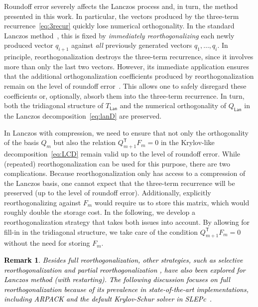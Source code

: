 \documentclass{siamart190516}
\newcommand{\Ttran}{\mathsf{T}}
\newcommand{\lan}{\mathsf{Lan}}
\newtheorem{remark}[theorem]{Remark}
\providecommand{\edit}[1]{\textcolor{black}{#1}}
\begin{document}
Roundoff error severely affects the Lanczos process and, in turn, the method presented in this work. In particular, the vectors 
produced by the three-term recurrence~\cref{eq:3recur} quickly lose numerical orthogonality. In the standard Lanczos method~\cite[p.~303]{Parlett1998}, this is fixed by \emph{immediately reorthogonalizing} each newly produced vector $q_{i+1}$ against \emph{all} previously generated vectors $q_1,\ldots, q_i$.
In principle, reorthogonalization destroys the three-term recurrence, since it involves more than only the last two vectors.
However, its immediate application ensures that the additional orthogonalization 
coefficients produced by reorthogonalization remain on the level of roundoff error~\cite[p.~350]{Stewart2001}.
This allows one to safely disregard these coefficients or, optionally, absorb them into the three-term recurrence. In turn, both the tridiagonal structure of $T_{\lan}$ and the numerical orthogonality of $Q_{\lan}$ in the Lanczos decomposition~\cref{eq:lanD} are preserved. 

In Lanczos with compression, we need to ensure that not only the orthogonality of the basis $Q_m$ but also the relation $Q_{m+1}^{\Ttran} F_m = 0$ in the Krylov-like decomposition~\eqref{eq:LCD} remain valid up to the level of roundoff error. While (repeated) reorthogonalization can be used for this purpose, there are two complications. Because reorthogonalization only has access to a compression of the Lanczos basis, one cannot expect that the three-term recurrence will be preserved (up to the level of roundoff error). Additionally, explicitly reorthogonalizing against $F_m$ would require us to store this matrix, which would roughly double the storage cost. 
In the following, we develop a reorthogonalization strategy that takes both issues into account. By allowing for fill-in in the
tridiagonal structure, we take care of the condition $Q_{m+1}^\Ttran F_m = 0$ without the need for storing $F_m$.%
\edit{\begin{remark}
    Besides full reorthogonalization, other strategies, such as selective reorthogonalization \cite{Parlett1979} and partial reorthogonalization \cite{Simon1984}, have also been explored for Lanczos method (with restarting). The following discussion focuses on full reorthogonalization because of its prevalence in state-of-the-art implementations, including 
    ARPACK \cite{lehoucq1998arpack} and the default Krylov-Schur solver in SLEPc~\cite{hernandez2007parallel}.
    \end{remark}
}
\end{document}
